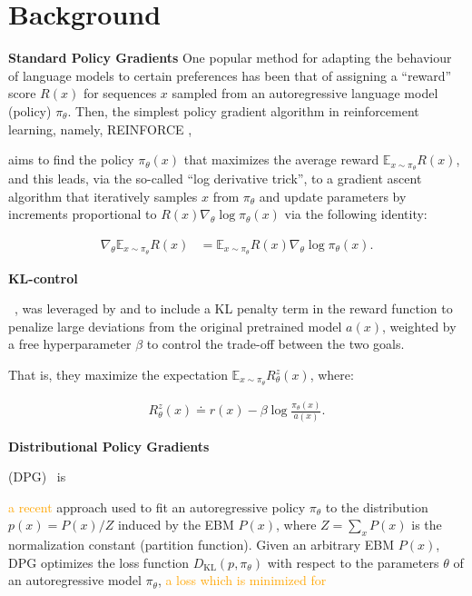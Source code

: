 \section{Background}

\textbf{Standard Policy Gradients}
\label{sec:pg}
One popular method for adapting the behaviour of language models to certain preferences has been that of assigning a ``reward'' score $R(x)$ for sequences $x$ sampled from an autoregressive language model (policy) $\pi_\theta$. 
Then, the simplest policy gradient algorithm in reinforcement learning, namely, REINFORCE \citep{Williams92}, 

aims to find the policy ${\pi_\theta}(x)$ that maximizes the average reward $\mathbb{E}_{x \sim {\pi_\theta}} R(x)$, and this leads, via the so-called ``log derivative trick'', to a gradient ascent algorithm that iteratively samples $x$ from ${\pi_\theta}$ and update parameters by increments proportional to $R(x)\nabla_\theta \log {\pi_\theta}(x)$ via the following identity:

\begin{align}
  \label{eq:REINFORCE}
  \nabla_\theta \mathbb{E}_{x \sim {\pi_\theta}} R(x) &= \mathbb{E}_{x \sim {\pi_\theta}} R(x) \nabla_\theta \log {\pi_\theta}(x).
\end{align}

\textbf{KL-control}
\label{sec:kl_control}

~\citep{todorov,kappen2012optimal}, was leveraged by \cite{Jaques-2017,KL_jaquesK19} and \cite{Ziegler19} to include a KL penalty term in the reward function to penalize large deviations from the original pretrained model $a(x)$, weighted by a free hyperparameter $\beta$ to control the trade-off between the two goals.

That is, they maximize the expectation $\mathbb{E}_{x \sim {\pi_\theta}} R^z_\theta(x)$, where:

\begin{align}
  R^z_\theta(x)\doteq r(x) - \beta \log \frac{{\pi_\theta}(x)}{a(x)}.
  \label{RTZ_first_mention}
\end{align}

 

\textbf{Distributional Policy Gradients}
\label{sec:dpg}

(DPG)~\citep{opt-rl-arxiv-2019} is 

\textcolor{orange}{a recent} approach used to fit an autoregressive policy ${\pi_\theta}$ to the distribution $p(x)=P(x)/Z$ induced by the EBM $P(x)$, where $Z=\sum_x P(x)$ is the normalization constant (partition function). Given an arbitrary EBM $P(x)$, DPG optimizes the loss function $D_{\mathrm{KL}}(p, {\pi_\theta})$ with respect to the parameters $\theta$ of an autoregressive model ${\pi_\theta}$, 
\textcolor{orange}{a loss which is minimized for}

